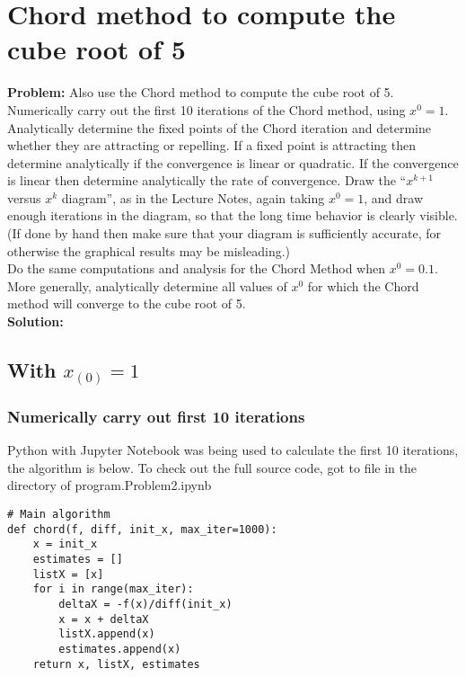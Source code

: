 \newpage
\section{Chord method to compute the cube root of 5}%
\label{sec:chord_method_to_compute_the_cube_root_of_5}

\textbf{Problem:}
Also use the Chord method to compute the cube root of 5.
Numerically carry out the first 10 iterations of the Chord method, using $x^{0} = 1$. 
Analytically determine the fixed points of the Chord iteration and determine whether they are attracting or repelling.
If a fixed point is attracting then determine analytically if the convergence is linear or quadratic.
If the convergence is linear then determine analytically the rate of convergence.
Draw the “$x^{k+1}$ versus $x^{k}$ diagram”, as in the Lecture Notes, again taking $x^{0} = 1$, and draw enough iterations in the diagram, so that the long time behavior is clearly visible.
(If done by hand then make sure that your diagram is sufficiently accurate, for otherwise the graphical results may be misleading.)
\\
Do the same computations and analysis for the Chord Method when $x^{0} = 0.1$.
\\
More generally, analytically determine all values of $x^{0}$ for which the Chord method will converge to the cube root of 5.
\\
\textbf{Solution:}
\subsection{With $x_{(0)} = 1$}

\subsubsection{Numerically carry out first 10 iterations}
Python with Jupyter Notebook was being used to calculate the first 10 iterations, the algorithm is below. To check out the full source code, got to file in the directory of program.Problem2.ipynb
\begin{lstlisting}
# Main algorithm
def chord(f, diff, init_x, max_iter=1000):
    x = init_x
    estimates = []
    listX = [x]
    for i in range(max_iter):
        deltaX = -f(x)/diff(init_x)
        x = x + deltaX
        listX.append(x)
        estimates.append(x)
    return x, listX, estimates
\end{lstlisting}


